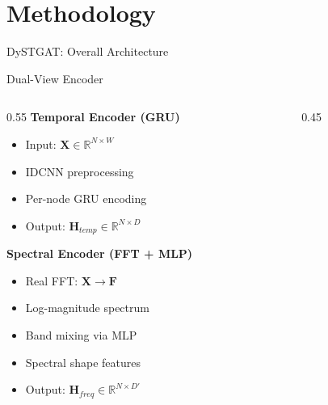 \documentclass[aspectratio=169,11pt]{beamer}
\begin{document}
\section{Methodology}

\begin{frame}{DySTGAT: Overall Architecture}
    \begin{center}
        
    \end{center}
\end{frame}

\begin{frame}{Dual-View Encoder}
    \begin{columns}
        \begin{column}{0.55\textwidth}
            \textbf{Temporal Encoder (GRU)}
            \begin{itemize}
                \item Input: $\mathbf{X} \in \mathbb{R}^{N \times W}$
                \item IDCNN preprocessing
                \item Per-node GRU encoding
                \item Output: $\mathbf{H}_{temp} \in \mathbb{R}^{N \times D}$
            \end{itemize}

            \vspace{0.3cm}
            \textbf{Spectral Encoder (FFT + MLP)}
            \begin{itemize}
                \item Real FFT: $\mathbf{X} \rightarrow \mathbf{F}$
                \item Log-magnitude spectrum
                \item Band mixing via MLP
                \item Spectral shape features
                \item Output: $\mathbf{H}_{freq} \in \mathbb{R}^{N \times D'}$
            \end{itemize}
        \end{column}
        \begin{column}{0.45\textwidth}
            
        \end{column}
    \end{columns}
\end{frame}
\end{document}
